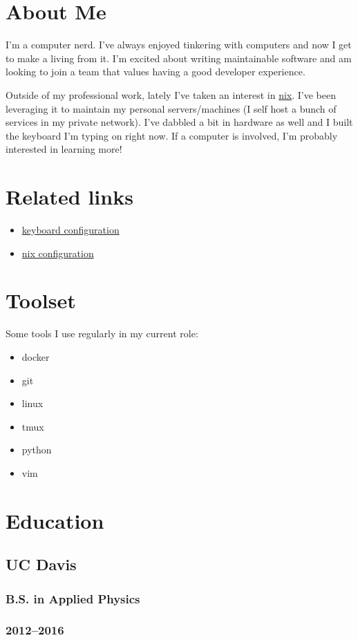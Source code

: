 \documentclass{article}
\begin{document}
\begin{minipage}[t]{.3\textwidth}
	\section*{About Me}
	I'm a computer nerd. I've always enjoyed tinkering with computers and now I
	get to make a living from it. I'm excited about writing maintainable
	software and am looking to join a team that values having a good developer
	experience.

	Outside of my professional work, lately I've taken an interest in
	\href{https://nixos.org/}{nix}. I've been leveraging it to maintain my
	personal servers/machines (I self host a bunch of services in my private
	network). I've dabbled a bit in hardware as well and I built the keyboard
	I'm typing on right now. If a computer is involved, I'm probably interested
	in learning more!

	\vspace{1em}
	\section*{Related links}
	\begin{itemize}
		\item \href{https://github.com/alejandro-angulo/qmk_firmware/tree/master/keyboards/crkbd/keymaps/alejandro-angulo}{keyboard configuration}
		\item \href{https://github.com/alejandro-angulo/dotfiles/}{nix configuration}
	\end{itemize}
	\section*{Toolset}
	Some tools I use regularly in my current role:
	\vspace{-0.6em}
	\begin{itemize}
		\item docker
		\item git
		\item linux
		\item tmux
		\item python
		\item vim
	\end{itemize}
	\section*{Education}
	\subsection*{UC Davis}
	\subsubsection*{B.S. in Applied Physics}
	\subsubsection*{2012--2016}
\end{minipage}
\end{document}
